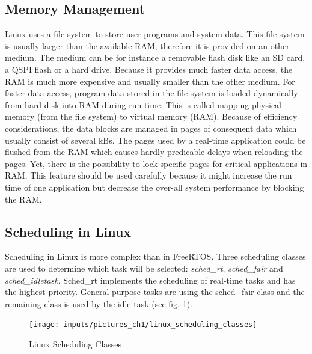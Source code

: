 \subsection{Memory Management}
Linux uses a file system to store user programs and system data. 
This file system is usually larger than the available \ac{RAM}, therefore it is provided on an other medium.
The medium can be for instance a removable flash disk like an \ac{SD} card, a \ac{QSPI} flash or a hard drive.
Because it provides much faster data access, the \ac{RAM} is much more expensive and usually smaller than the other medium. 
For faster data access, program data stored in the file system is loaded dynamically from hard disk into \ac{RAM} during run time.
This is called mapping physical memory (from the file system) to virtual memory (\ac{RAM}).
Because of efficiency considerations, the data blocks are managed in pages of consequent data which usually consist of several kBs.
The pages used by a real-time application could be flushed from the \ac{RAM} which causes hardly predicable delays when reloading the pages.
Yet, there is the possibility to lock specific pages for critical applications in \ac{RAM}.
This feature should be used carefully because it might increase the run time of one application but decrease the over-all system performance by blocking the \ac{RAM}.   

\subsection{Scheduling in Linux}\label{ss_scheduling_in_linux} 
Scheduling in Linux \cite{love:lkd} \cite{jones:itlcfss} is more complex than in FreeRTOS.
Three scheduling classes are used to determine which task will be selected: \textit{sched\_rt}, \textit{sched\_fair} and \textit{sched\_idletask}.
Sched\_rt implements the scheduling of real-time tasks and has the highest priority. 
General purpose tasks are using the sched\_fair class and the remaining class is used by the idle task (see fig. \ref{fig_linux_scheduling_classes}).

\begin{figure}[htb]
	\begin{center}
		\texttt{[image: inputs/pictures\_ch1/linux\_scheduling\_classes]}
	\end{center}
	\caption[Linux Scheduling Classes]{Linux Scheduling Classes \cite{jones:itlcfss}} \label{fig_linux_scheduling_classes}
\end{figure}

